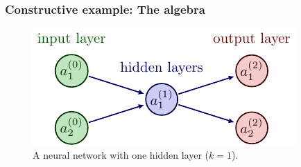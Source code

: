 \documentclass[11pt]{article}
\begin{document}
\subsubsection{Constructive example: The algebra}

\begin{figure}[ht]
    \centering
    \includegraphics{./figures/neural_nets/MLP_2.pdf}
    \caption{A neural network with one hidden layer ($k=1$).}
    \label{fig:neural_nets_simple_example}
\end{figure}
\end{document}
